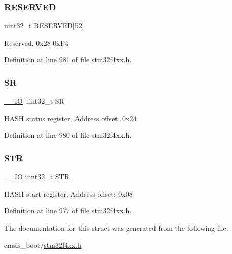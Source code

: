 \subsubsection{\texorpdfstring{R\+E\+S\+E\+R\+V\+ED}{RESERVED}}
{\footnotesize\ttfamily uint32\+\_\+t R\+E\+S\+E\+R\+V\+ED\mbox{[}52\mbox{]}}

Reserved, 0x28-\/0x\+F4 

Definition at line 981 of file stm32f4xx.\+h.

\mbox{\label{struct_h_a_s_h___type_def_af6aca2bbd40c0fb6df7c3aebe224a360}} 
\subsubsection{\texorpdfstring{SR}{SR}}
{\footnotesize\ttfamily \hyperlink{group___c_m_s_i_s__core__definitions_gaec43007d9998a0a0e01faede4133d6be}{\+\_\+\+\_\+\+IO} uint32\+\_\+t SR}

H\+A\+SH status register, Address offset\+: 0x24 

Definition at line 980 of file stm32f4xx.\+h.

\mbox{\label{struct_h_a_s_h___type_def_a7060ac1ed928ee931d7664650f2dcf75}} 
\subsubsection{\texorpdfstring{S\+TR}{STR}}
{\footnotesize\ttfamily \hyperlink{group___c_m_s_i_s__core__definitions_gaec43007d9998a0a0e01faede4133d6be}{\+\_\+\+\_\+\+IO} uint32\+\_\+t S\+TR}

H\+A\+SH start register, Address offset\+: 0x08 

Definition at line 977 of file stm32f4xx.\+h.



The documentation for this struct was generated from the following file\+:\begin{DoxyCompactItemize}
\item 
cmsis\+\_\+boot/\hyperlink{stm32f4xx_8h}{stm32f4xx.\+h}\end{DoxyCompactItemize}
